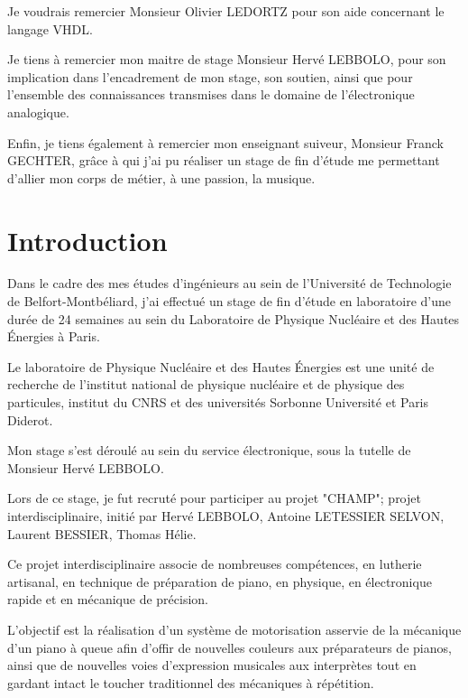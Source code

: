 \documentclass[french,a4paper,12pt]{report}
\begin{document}
  Je voudrais remercier Monsieur Olivier LEDORTZ pour son aide concernant le langage VHDL.\newline
  
  Je tiens à remercier mon maitre de stage Monsieur Hervé LEBBOLO, pour son implication dans l'encadrement de mon stage, son soutien, ainsi que pour l'ensemble des connaissances transmises dans le domaine de l'électronique analogique.\newline
  
  Enfin, je tiens également à remercier mon enseignant suiveur, Monsieur Franck GECHTER, grâce à qui j'ai pu réaliser un stage de fin d'étude me permettant d'allier mon corps de métier, à une passion, la musique.
  
 \chapter{Introduction}

Dans le cadre des mes études d'ingénieurs au sein de l'Université de Technologie de Belfort-Montbéliard, j'ai effectué un stage de fin d'étude en laboratoire d'une durée de 24 semaines au sein du Laboratoire de Physique Nucléaire et des Hautes Énergies à Paris.\newline

Le laboratoire de Physique Nucléaire et des Hautes Énergies est une unité de recherche de l'institut national de  physique nucléaire et de physique des particules, institut du CNRS et des universités Sorbonne Université et Paris Diderot.\newline

Mon stage s'est déroulé au sein du service électronique, sous la tutelle de Monsieur Hervé LEBBOLO.\newline

Lors de ce stage, je fut recruté pour participer au projet "CHAMP"; projet interdisciplinaire, initié par Hervé LEBBOLO, Antoine LETESSIER SELVON, Laurent BESSIER, Thomas Hélie.

Ce projet interdisciplinaire associe de nombreuses compétences, en lutherie artisanal, en technique de préparation de piano, en physique, en électronique rapide et en mécanique de précision.

L'objectif est la réalisation d'un système de motorisation asservie de la mécanique d'un piano à queue afin d'offir de nouvelles couleurs aux préparateurs de pianos, ainsi que de nouvelles voies d'expression musicales aux interprètes tout en gardant intact le toucher traditionnel des mécaniques à répétition.\newline
\end{document}
